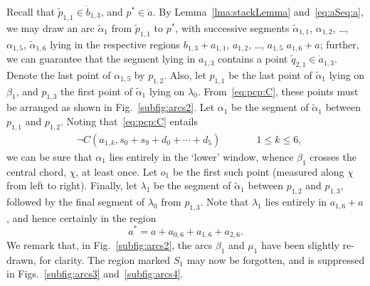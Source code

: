 \documentclass{article}
\newcommand{\intermediate}[1]{\dot{#1}}
\newcommand{\inner}[1]{\ddot{#1}}
\begin{document}
Recall that $\tilde{p}_{1,1} \in \intermediate{b}_{1,3}$, and $p^* \in
\inner{a}$.  By Lemma~\ref{lma:stackLemma} and~\eqref{eq:aSeq:a}, we may draw an arc
$\tilde{\alpha}_1$ from $\tilde{p}_{1,1}$ to $p^*$, with successive
segments $\tilde{\alpha}_{1,1}$, $\alpha_{1,2}$, \ldots,
$\alpha_{1,5}$, $\tilde{\alpha}_{1,6}$ lying in the respective regions
$b_{1,3} + a_{1,1}$, $a_{1,2}$, \dots, $a_{1,5}$ $a_{1,6} + a$;
further, we can guarantee that the segment lying in $a_{1,3}$ contains
a point $\tilde{q}_{2,1}\in \intermediate{a}_{1,3}$.  Denote the last
point of $\alpha_{1,5}$ by $p_{1,2}$.  Also, let $p_{1,1}$ be the last
point of $\tilde{\alpha}_1$ lying on $\beta_1$, and $p_{1,3}$ the
first point of $\tilde{\alpha}_1$ lying on $\lambda_0$.
From~\eqref{eq:pcp:C}, these points must be arranged as shown in
Fig.~\ref{subfig:arcs2}.  Let $\alpha_1$ be the segment of
$\tilde{\alpha}_1$ between $p_{1,1}$ and $p_{1,2}$.  Noting
that~\eqref{eq:pcp:C} entails
\begin{align*}
& \neg C(a_{1,k}, s_0 + s_9 + d_0+ \cdots + d_5 ) & & \qquad{1 \leq k
    \leq 6},
\end{align*}
we can be sure that $\alpha_1$ lies entirely in the `lower' window,
whence $\beta_1$ crosses the central chord, $\chi$, at least once. Let
$o_1$ be the first such point (measured along $\chi$ from left to
right).  Finally, let $\lambda_1$ be the segment of $\tilde{\alpha}_1$
between $p_{1,2}$ and $p_{1,3}$, followed by the final segment of
$\lambda_0$ from $p_{1,3}$. Note that $\lambda_1$ lies entirely in
$a_{1,6} + a$, and hence certainly in the region
\begin{equation*}
a^* = a + a_{0,6} + a_{1,6} + a_{2,6}.
\end{equation*}
We remark that, in Fig.~\ref{subfig:arcs2}, the arcs $\beta_1$ and
$\mu_1$ have been slightly re-drawn, for clarity.  The region marked
$S_1$ may now be forgotten, and is suppressed in Figs.~\ref{subfig:arcs3}
and~\ref{subfig:arcs4}.
\end{document}
